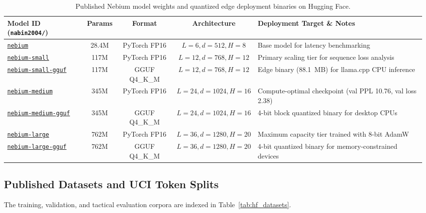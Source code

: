 \begin{table}[htbp]
\centering
\footnotesize
\caption{Published Nebium model weights and quantized edge deployment binaries on Hugging Face.}
\label{tab:hf_models}
\begin{tabularx}{\linewidth}{@{} p{4.6cm} c c c X @{}}
\toprule
\textbf{Model ID (\texttt{nabin2004/})} & \textbf{Params} & \textbf{Format} & \textbf{Architecture} & \textbf{Deployment Target \& Notes} \\
\midrule
\href{https://huggingface.co/nabin2004/nebium}{\texttt{nebium}} & 28.4M & PyTorch FP16 & $L=6, d=512, H=8$ & Base model for latency benchmarking \\
\href{https://huggingface.co/nabin2004/nebium-small}{\texttt{nebium-small}} & 117M & PyTorch FP16 & $L=12, d=768, H=12$ & Primary scaling tier for sequence loss analysis \\
\href{https://huggingface.co/nabin2004/nebium-small-gguf}{\texttt{nebium-small-gguf}} & 117M & GGUF Q4\_K\_M & $L=12, d=768, H=12$ & Edge binary (88.1~MB) for llama.cpp CPU inference \\
\href{https://huggingface.co/nabin2004/nebium-medium}{\texttt{nebium-medium}} & 345M & PyTorch FP16 & $L=24, d=1024, H=16$ & Compute-optimal checkpoint (val PPL 10.76, val loss 2.38) \\
\href{https://huggingface.co/nabin2004/nebium-medium-gguf}{\texttt{nebium-medium-gguf}} & 345M & GGUF Q4\_K\_M & $L=24, d=1024, H=16$ & 4-bit block quantized binary for desktop CPUs \\
\href{https://huggingface.co/nabin2004/nebium-large}{\texttt{nebium-large}} & 762M & PyTorch FP16 & $L=36, d=1280, H=20$ & Maximum capacity tier trained with 8-bit AdamW \\
\href{https://huggingface.co/nabin2004/nebium-large-gguf}{\texttt{nebium-large-gguf}} & 762M & GGUF Q4\_K\_M & $L=36, d=1280, H=20$ & 4-bit quantized binary for memory-constrained devices \\
\bottomrule
\end{tabularx}
\end{table}

\subsection{Published Datasets and UCI Token Splits}
\label{sec:appendix_datasets_table}

The training, validation, and tactical evaluation corpora are indexed in Table~\ref{tab:hf_datasets}.

